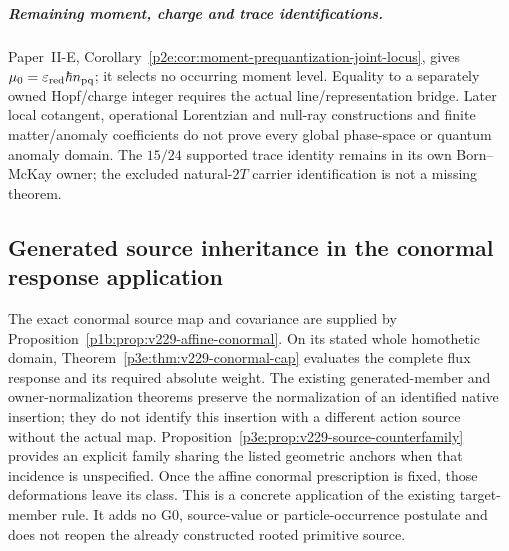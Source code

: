 \documentclass[12pt,a4paper]{article}
\begin{document}
\subparagraph{Remaining moment, charge and trace identifications.}
Paper~II-E, Corollary~\ref{p2e:cor:moment-prequantization-joint-locus},
gives $\mu_0=\varepsilon_{\rm red}\hbar n_{\rm pq}$; it selects no
occurring moment level. Equality to a separately owned Hopf/charge integer
requires the actual line/representation bridge. Later local cotangent,
operational Lorentzian and null-ray constructions and finite matter/anomaly
coefficients do not prove every global phase-space or quantum anomaly domain.
The $15/24$ supported trace identity remains in its own Born--McKay owner;
the excluded natural-$2T$ carrier identification is not a missing theorem.



\subsection{Generated source inheritance in the conormal response application}
\label{p2a:sec:v229-conormal-inheritance}
The exact conormal source map and covariance are supplied by
Proposition~\ref{p1b:prop:v229-affine-conormal}. On its stated whole
homothetic domain, Theorem~\ref{p3e:thm:v229-conormal-cap} evaluates
the complete flux response and its required absolute weight.
The existing generated-member and owner-normalization theorems preserve
the normalization of an identified native insertion; they do not
identify this insertion with a different action source without the
actual map. Proposition~\ref{p3e:prop:v229-source-counterfamily}
provides an explicit family sharing the listed geometric anchors when
that incidence is unspecified. Once the affine conormal prescription
is fixed, those deformations leave its class.
This is a concrete application of the existing target-member rule.
It adds no G0, source-value or particle-occurrence postulate and does
not reopen the already constructed rooted primitive source.
\end{document}
